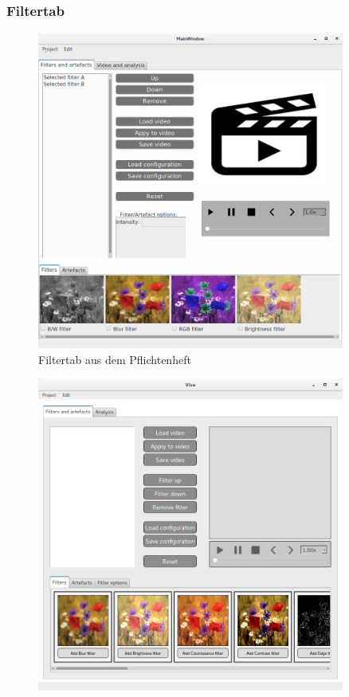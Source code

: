 \documentclass{scrartcl}
\begin{document}
{\subsubsection{Filtertab}
\bigskip
\begin{figure}[ht]
\centering
\includegraphics[width=0.9\textwidth]{Pictures/filtertabalt.png}
\caption{Filtertab aus dem Pflichtenheft}
\end{figure}
\begin{figure}[ht]
\centering
\includegraphics[width=0.9\textwidth]{Pictures/filtertabneu.png}

\end{figure}}
\end{document}
